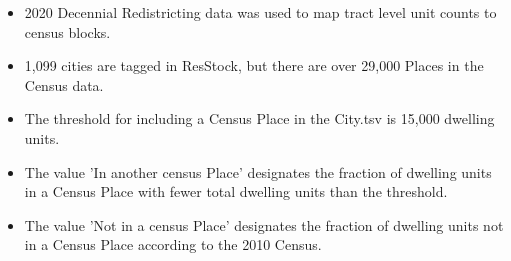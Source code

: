 \begin{itemize}
\item 2020 Decennial Redistricting data was used to map tract level unit counts to census blocks.
\item 1,099 cities are tagged in ResStock, but there are over 29,000 Places in the Census data.
\item The threshold for including a Census Place in the City.tsv is 15,000 dwelling units.
\item The value 'In another census Place' designates the fraction of dwelling units in a Census Place with fewer total dwelling units than the threshold.
\item The value 'Not in a census Place' designates the fraction of dwelling units not in a Census Place according to the 2010 Census.
\end{itemize}
